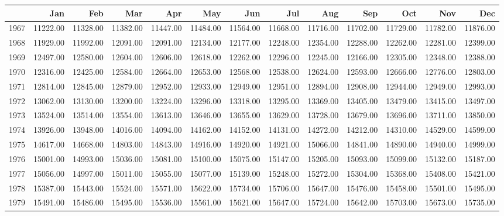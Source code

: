 \begin{longtable}{rrrrrrrrrrrrr}
  \hline
 & Jan & Feb & Mar & Apr & May & Jun & Jul & Aug & Sep & Oct & Nov & Dec \\ 
  \hline
1967 & 11222.00 & 11328.00 & 11382.00 & 11447.00 & 11484.00 & 11564.00 & 11668.00 & 11716.00 & 11702.00 & 11729.00 & 11782.00 & 11876.00 \\ 
  1968 & 11929.00 & 11992.00 & 12091.00 & 12091.00 & 12134.00 & 12177.00 & 12248.00 & 12354.00 & 12288.00 & 12262.00 & 12281.00 & 12399.00 \\ 
  1969 & 12497.00 & 12580.00 & 12604.00 & 12606.00 & 12618.00 & 12262.00 & 12296.00 & 12245.00 & 12166.00 & 12305.00 & 12348.00 & 12388.00 \\ 
  1970 & 12316.00 & 12425.00 & 12584.00 & 12664.00 & 12653.00 & 12568.00 & 12538.00 & 12624.00 & 12593.00 & 12666.00 & 12776.00 & 12803.00 \\ 
  1971 & 12814.00 & 12845.00 & 12879.00 & 12952.00 & 12933.00 & 12949.00 & 12951.00 & 12894.00 & 12908.00 & 12944.00 & 12949.00 & 12993.00 \\ 
  1972 & 13062.00 & 13130.00 & 13200.00 & 13224.00 & 13296.00 & 13318.00 & 13295.00 & 13369.00 & 13405.00 & 13479.00 & 13415.00 & 13497.00 \\ 
  1973 & 13524.00 & 13514.00 & 13554.00 & 13613.00 & 13646.00 & 13655.00 & 13629.00 & 13728.00 & 13679.00 & 13696.00 & 13711.00 & 13850.00 \\ 
  1974 & 13926.00 & 13948.00 & 14016.00 & 14094.00 & 14162.00 & 14152.00 & 14131.00 & 14272.00 & 14212.00 & 14310.00 & 14529.00 & 14599.00 \\ 
  1975 & 14617.00 & 14668.00 & 14803.00 & 14843.00 & 14916.00 & 14920.00 & 14921.00 & 15066.00 & 14841.00 & 14890.00 & 14940.00 & 14999.00 \\ 
  1976 & 15001.00 & 14993.00 & 15036.00 & 15081.00 & 15100.00 & 15075.00 & 15147.00 & 15205.00 & 15093.00 & 15099.00 & 15132.00 & 15187.00 \\ 
  1977 & 15056.00 & 14997.00 & 15011.00 & 15055.00 & 15077.00 & 15139.00 & 15248.00 & 15272.00 & 15304.00 & 15368.00 & 15408.00 & 15421.00 \\ 
  1978 & 15387.00 & 15443.00 & 15524.00 & 15571.00 & 15622.00 & 15734.00 & 15706.00 & 15647.00 & 15476.00 & 15458.00 & 15501.00 & 15495.00 \\ 
  1979 & 15491.00 & 15486.00 & 15495.00 & 15536.00 & 15561.00 & 15621.00 & 15647.00 & 15724.00 & 15642.00 & 15703.00 & 15673.00 & 15735.00 \\ 

\end{longtable}
